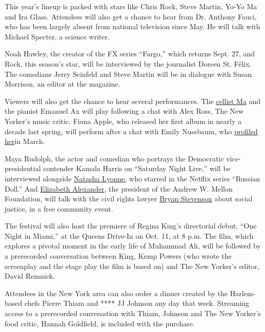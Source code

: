 This year's lineup is packed with stars like Chris Rock, Steve Martin,
Yo-Yo Ma and Ira Glass. Attendees will also get a chance to hear from
Dr. Anthony Fauci, who has been largely absent from national television
since May. He will talk with Michael Specter, a science writer.

Noah Hawley, the creator of the FX series ``Fargo,'' which returns Sept.
27, and Rock, this season's star, will be interviewed by the journalist
Doreen St. Félix. The comedians Jerry Seinfeld and Steve Martin will be
in dialogue with Susan Morrison, an editor at the magazine.

Viewers will also get the chance to hear several performances. The
\href{https://www.nytimes3xbfgragh.onion/2020/06/03/arts/music/five-minutes-classical-music-cello.html}{cellist
Ma} and the pianist Emanuel Ax will play following a chat with Alex
Ross, The New Yorker's music critic. Fiona Apple, who released her first
album in nearly a decade last spring, will perform after a chat with
Emily Nussbaum, who
\href{https://www.newyorker.com/magazine/2020/03/23/fiona-apples-art-of-radical-sensitivity}{profiled
her}in March.

Maya Rudolph, the actor and comedian who portrays the Democratic
vice-presidential contender Kamala Harris on ``Saturday Night Live,''
will be interviewed alongside
\href{https://www.nytimes3xbfgragh.onion/2019/07/16/arts/television/natasha-lyonne-russian-doll-emmys.html}{Natasha
Lyonne,} who starred in the Netflix series ``Russian Doll.'' And
\href{https://www.nytimes3xbfgragh.onion/2018/02/07/arts/design/mellon-foundation-president-elizabeth-alexander.html}{Elizabeth
Alexander}, the president of the Andrew W. Mellon Foundation, will talk
with the civil rights lawyer
\href{https://www.nytimes3xbfgragh.onion/2020/01/23/books/review/just-mercy-bryan-stevenson.html}{Bryan
Stevenson} about social justice, in a free community event.

The festival will also host the premiere of Regina King's directorial
debut, ``One Night in Miami,'' at the Queens Drive-In on Oct. 11, at 8
p.m. The film, which explores a pivotal moment in the early life of
Muhammad Ali, will be followed by a prerecorded conversation between
King, Kemp Powers (who wrote the screenplay and the stage play the film
is based on) and The New Yorker's editor, David Remnick.

Attendees in the New York area can also order a dinner created by the
Harlem-based chefs Pierre Thiam and **** JJ Johnson any day that week.
Streaming access to a prerecorded conversation with Thiam, Johnson and
The New Yorker's food critic, Hannah Goldfield, is included with the
purchase.

